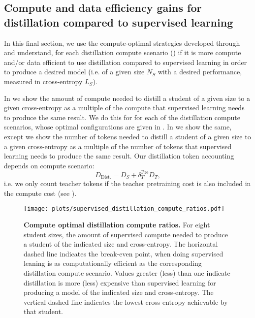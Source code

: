\subsection{Compute and data efficiency gains for distillation compared to supervised learning}
In this final section, we use the compute-optimal strategies developed through 
and understand, for each distillation compute scenario ()
if it is more compute and/or data efficient to use distillation compared to supervised learning
in order to produce a desired model (i.e. of a given size $N_S$ with a desired performance, measured in cross-entropy $L_S$).

In  we show the amount of compute needed to distill a student of a given size to a given cross-entropy as a multiple of the compute that supervised learning needs to produce the same result.
We do this for for each of the distillation compute scenarios, whose optimal configurations are given in
.
In 
we show the same, except we show the number of tokens needed to distill a student of a given size to a given cross-entropy as a multiple of the number of tokens that supervised learning needs to produce the same result.
Our distillation token accounting depends on compute scenario:
\begin{equation}
    D_{\mathrm{Dist.}} = D_S + \delta_T^{\mathrm{Pre}} D_T,
\end{equation}
i.e. we only count teacher tokens if the teacher pretraining cost is also included in the compute cost (see ).

\begin{figure}[h]
	\centering
	\texttt{[image: plots/supervised\_distillation\_compute\_ratios.pdf]}
	\caption{\textbf{Compute optimal distillation compute ratios.} For eight student sizes, the amount of supervised compute needed to produce a student of the indicated size and cross-entropy.
    The horizontal dashed line indicates the break-even point, when doing supervised leaning is as computationally efficient as the corresponding distillation compute scenario.
    Values greater (less) than one indicate distillation is more (less) expensive than supervised learning for producing a model of the indicated size and cross-entropy. 
    The vertical dashed line indicates the lowest cross-entropy achievable by that student.
	}
	\label{fig:compute-optimal-distillation-compute-ratios-app}
\end{figure}


